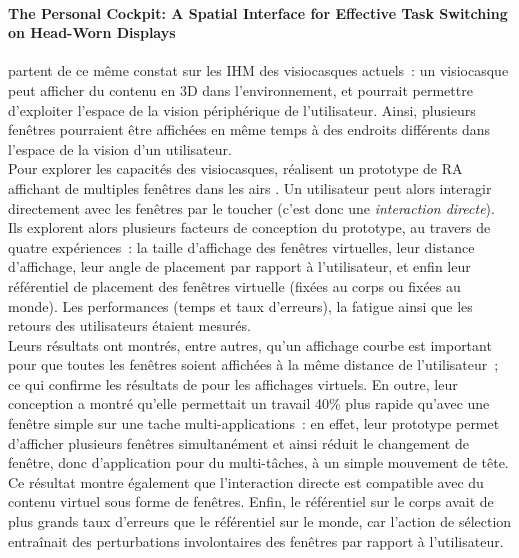 \paragraph*{\foreignlanguage{english}{The Personal Cockpit: A Spatial Interface for Effective Task Switching on Head-Worn Displays}}
\citet{EnsFinneganIrani2014} partent de ce même constat sur les IHM des visiocasques actuels~: un visiocasque peut afficher du contenu en 3D dans l'environnement, et pourrait permettre d'exploiter l'espace de la vision périphérique de l'utilisateur. Ainsi, plusieurs fenêtres pourraient être affichées en même temps à des endroits différents dans l'espace de la vision d'un utilisateur.\\
Pour explorer les capacités des visiocasques, \citeauthor{EnsFinneganIrani2014} réalisent un prototype de RA affichant de multiples fenêtres dans les airs . Un utilisateur peut alors interagir directement avec les fenêtres par le toucher (c'est donc une \emph{interaction directe}). Ils explorent alors plusieurs facteurs de conception du prototype, au travers de quatre expériences~: la taille d'affichage des fenêtres virtuelles, leur distance d'affichage, leur angle de placement par rapport à l'utilisateur, et enfin leur référentiel de placement des fenêtres virtuelle (fixées au corps ou fixées au monde). Les performances (temps et taux d'erreurs), la fatigue ainsi que les retours des utilisateurs étaient mesurés.\\ 
Leurs résultats ont montrés, entre autres, qu'un affichage courbe est important pour que toutes les fenêtres soient affichées à la même distance de l'utilisateur~; ce qui confirme les résultats de \citet{ShuppBallYostEtAl2006} pour les affichages virtuels. En outre, leur conception a montré qu'elle permettait un travail 40\% plus rapide qu'avec une fenêtre simple sur une tache multi-applications~: en effet, leur prototype permet d'afficher plusieurs fenêtres simultanément et ainsi réduit le changement de fenêtre, donc d'application pour du multi-tâches, à un simple mouvement de tête. Ce résultat montre également que l'interaction directe est compatible avec du contenu virtuel sous forme de fenêtres. Enfin, le référentiel sur le corps avait de plus grands taux d'erreurs que le référentiel sur le monde, car l'action de sélection entraînait des perturbations involontaires des fenêtres par rapport à l'utilisateur.\\ 
